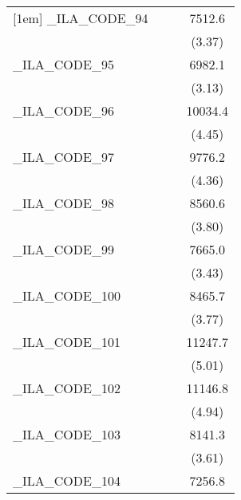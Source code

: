 {\begin{tabular}{l*{3}{c}}
[1em]
\_ILA\_CODE\_94&                     &                     &      7512.6\sym{***}\\
            &                     &                     &      (3.37)         \\
[1em]
\_ILA\_CODE\_95&                     &                     &      6982.1\sym{**} \\
            &                     &                     &      (3.13)         \\
[1em]
\_ILA\_CODE\_96&                     &                     &     10034.4\sym{***}\\
            &                     &                     &      (4.45)         \\
[1em]
\_ILA\_CODE\_97&                     &                     &      9776.2\sym{***}\\
            &                     &                     &      (4.36)         \\
[1em]
\_ILA\_CODE\_98&                     &                     &      8560.6\sym{***}\\
            &                     &                     &      (3.80)         \\
[1em]
\_ILA\_CODE\_99&                     &                     &      7665.0\sym{***}\\
            &                     &                     &      (3.43)         \\
[1em]
\_ILA\_CODE\_100&                     &                     &      8465.7\sym{***}\\
            &                     &                     &      (3.77)         \\
[1em]
\_ILA\_CODE\_101&                     &                     &     11247.7\sym{***}\\
            &                     &                     &      (5.01)         \\
[1em]
\_ILA\_CODE\_102&                     &                     &     11146.8\sym{***}\\
            &                     &                     &      (4.94)         \\
[1em]
\_ILA\_CODE\_103&                     &                     &      8141.3\sym{***}\\
            &                     &                     &      (3.61)         \\
[1em]
\_ILA\_CODE\_104&                     &                     &      7256.8\sym{**} \\

\end{tabular}}

